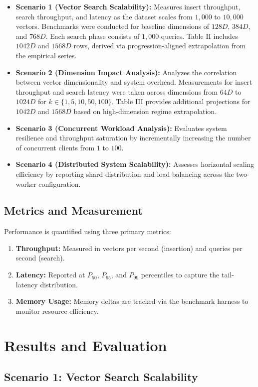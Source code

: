 \documentclass[conference]{IEEEtran}
\begin{document}
\begin{itemize}
    \item \textbf{Scenario 1 (Vector Search Scalability):} Measures insert throughput, search throughput, and latency as the dataset scales from $1,000$ to $10,000$ vectors. Benchmarks were conducted for baseline dimensions of $128D$, $384D$, and $768D$. Each search phase consists of $1,000$ queries. Table II includes $1042D$ and $1568D$ rows, derived via progression-aligned extrapolation from the empirical series.
    \item \textbf{Scenario 2 (Dimension Impact Analysis):} Analyzes the correlation between vector dimensionality and system overhead. Measurements for insert throughput and search latency were taken across dimensions from $64D$ to $1024D$ for $k \in \{1, 5, 10, 50, 100\}$. Table III provides additional projections for $1042D$ and $1568D$ based on high-dimension regime extrapolation.
    \item \textbf{Scenario 3 (Concurrent Workload Analysis):} Evaluates system resilience and throughput saturation by incrementally increasing the number of concurrent clients from $1$ to $100$.
    \item \textbf{Scenario 4 (Distributed System Scalability):} Assesses horizontal scaling efficiency by reporting shard distribution and load balancing across the two-worker configuration.
\end{itemize}

\subsection{Metrics and Measurement}
Performance is quantified using three primary metrics:
\begin{enumerate}
    \item \textbf{Throughput:} Measured in vectors per second (insertion) and queries per second (search).
    \item \textbf{Latency:} Reported at $P_{50}$, $P_{95}$, and $P_{99}$ percentiles to capture the tail-latency distribution.
    \item \textbf{Memory Usage:} Memory deltas are tracked via the benchmark harness to monitor resource efficiency.
\end{enumerate}

\section{Results and Evaluation}
\subsection{Scenario 1: Vector Search Scalability}
\end{document}
